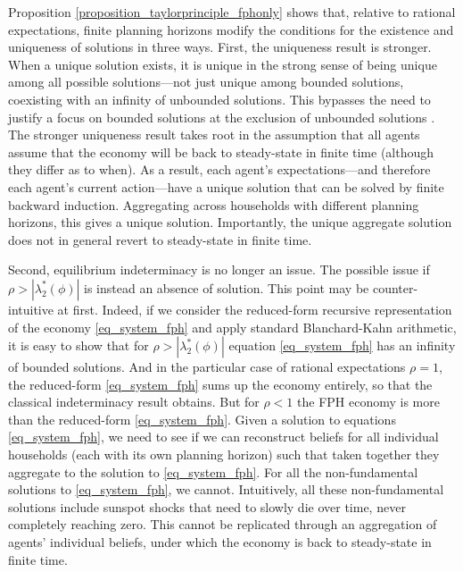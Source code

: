 \documentclass{article}
\begin{document}
Proposition \ref{proposition_taylorprinciple_fphonly} shows that, relative to rational expectations, finite planning horizons modify the conditions for the existence and uniqueness of solutions in three ways. First, the uniqueness result is stronger. When a unique solution exists, it is unique in the strong sense of being unique among all possible solutions---not just unique among bounded solutions, coexisting with an infinity of unbounded solutions. This bypasses the need to justify a focus on bounded solutions at the exclusion of unbounded solutions \citep{Cochrane2011}. The stronger uniqueness result takes root in the assumption that all agents assume that the economy will be back to steady-state in finite time (although they differ as to when). As a result, each agent's expectations---and therefore each agent's current action---have a unique solution that can be solved by finite backward induction. Aggregating across households with different planning horizons, this gives a unique solution. Importantly, the unique aggregate solution does not in general revert to steady-state in finite time.

Second, equilibrium indeterminacy is no longer an issue. The possible issue if $\rho>|\lambda_2^*(\phi)|$ is instead an absence of solution. This point may be counter-intuitive at first. Indeed, if we consider the reduced-form recursive representation of the economy \eqref{eq_system_fph} and apply standard Blanchard-Kahn arithmetic, it is easy to show that for $\rho>|\lambda_2^*(\phi)|$ equation \eqref{eq_system_fph} has an infinity of bounded solutions. And in the particular case of rational expectations $\rho=1$, the reduced-form \eqref{eq_system_fph} sums up the economy entirely, so that the classical indeterminacy result obtains. But for $\rho<1$ the FPH economy is more than the reduced-form \eqref{eq_system_fph}. Given a solution to equations \eqref{eq_system_fph}, we need to see if we can reconstruct beliefs for all individual households (each with its own planning horizon) such that taken together they aggregate to the solution to \eqref{eq_system_fph}. For all the non-fundamental solutions to \eqref{eq_system_fph}, we cannot. Intuitively, all these non-fundamental solutions include sunspot shocks that need to slowly die over time, never completely reaching zero. This cannot be replicated through an aggregation of agents' individual beliefs, under which the economy is back to steady-state in finite time.
\end{document}
